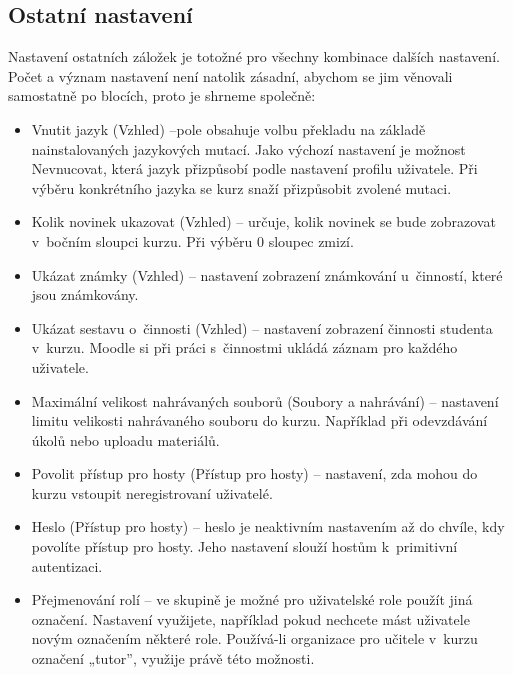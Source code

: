 \documentclass[
print,
  11pt,
  table,   
  nolof,    
  nolot,
  oneside,final
]{fithesis3}
\begin{document}
\subsection*{Ostatní nastavení}
Nastavení ostatních záložek je totožné pro všechny kombinace dalších nastavení. Počet a význam nastavení není natolik zásadní, abychom se jim věnovali samostatně po blocích, proto je shrneme společně:
\begin{itemize}
	\item Vnutit jazyk (Vzhled) --pole obsahuje volbu překladu na základě nainstalovaných jazykových mutací. Jako výchozí nastavení je možnost Nevnucovat, která jazyk přizpůsobí podle nastavení profilu uživatele. Při výběru konkrétního jazyka se kurz snaží přizpůsobit zvolené mutaci.
	\item Kolik novinek ukazovat (Vzhled) -- určuje, kolik novinek se bude zobrazovat v~bočním sloupci kurzu. Při výběru 0 sloupec zmizí.
	\item Ukázat známky (Vzhled) -- nastavení zobrazení známkování u~činností, které jsou známkovány.
	\item Ukázat sestavu o~činnosti (Vzhled) -- nastavení zobrazení činnosti studenta v~kurzu. Moodle si při práci s~činnostmi ukládá záznam pro každého uživatele.
	\item Maximální velikost nahrávaných souborů (Soubory a nahrávání) -- nastavení limitu velikosti nahrávaného souboru do kurzu. Například při odevzdávání úkolů nebo uploadu materiálů.
	\item Povolit přístup pro hosty (Přístup pro hosty) -- nastavení, zda mohou do kurzu vstoupit neregistrovaní uživatelé. 
	\item Heslo (Přístup pro hosty) -- heslo je neaktivním nastavením až do chvíle, kdy povolíte přístup pro hosty. Jeho nastavení slouží hostům k~primitivní autentizaci.
	\item Přejmenování rolí -- ve skupině je možné pro uživatelské role použít jiná označení. Nastavení využijete, například pokud nechcete mást uživatele novým označením některé role. Používá-li organizace pro učitele v~kurzu označení „tutor”, využije právě této možnosti. 
\end{itemize}
\end{document}
